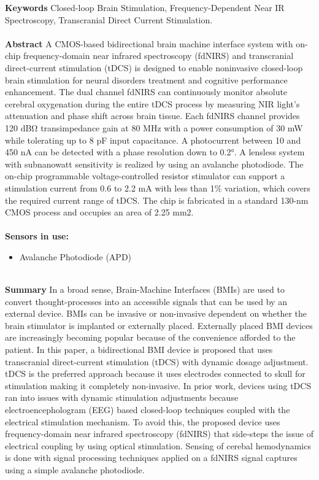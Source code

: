 \noindent
\textbf{Keywords} Closed-loop Brain Stimulation, Frequency-Dependent Near IR Spectroscopy, Transcranial Direct Current Stimulation. \\ \\

\noindent
\textbf{Abstract} A CMOS-based bidirectional brain machine interface system with on-chip frequency-domain near infrared spectroscopy (fdNIRS) and transcranial direct-current stimulation (tDCS) is designed to enable noninvasive closed-loop brain stimulation for neural disorders treatment and cognitive performance enhancement. The dual channel fdNIRS can continuously monitor absolute cerebral oxygenation during the entire tDCS process by measuring NIR light's attenuation and phase shift across brain tissue. Each fdNIRS channel provides 120 dBΩ transimpedance gain at 80 MHz with a power consumption of 30 mW while tolerating up to 8 pF input capacitance. A photocurrent between 10 and 450 nA can be detected with a phase resolution down to 0.2°. A lensless system with subnanowatt sensitivity is realized by using an avalanche photodiode. The on-chip programmable voltage-controlled resistor stimulator can support a stimulation current from 0.6 to 2.2 mA with less than 1\% variation, which covers the required current range of tDCS. The chip is fabricated in a standard 130-nm CMOS process and occupies an area of 2.25 mm2. \\ \\

\noindent
\textbf{Sensors in use:}
\begin{itemize}
    \item Avalanche Photodiode (APD) \\ \\
\end{itemize}

\noindent
\textbf{Summary} In a broad sense, Brain-Machine Interfaces (BMIs) are used to convert thought-processes into an accessible signals that can be used by an external device. BMIs can be invasive or non-invasive dependent on whether the brain stimulator is implanted or externally placed. Externally placed BMI devices are increasingly becoming popular because of the convenience afforded to the patient. In this paper, a bidirectional BMI device is proposed that uses transcranial direct-current stimulation (tDCS) with dynamic dosage adjustment. tDCS is the preferred approach because it uses electrodes connected to skull for stimulation making it completely non-invasive. In prior work, devices using tDCS ran into issues with dynamic stimulation adjustments because electroencephologram (EEG) based closed-loop techniques coupled with the electrical stimulation mechanism. To avoid this, the proposed device uses frequency-domain near infrared spectroscopy (fdNIRS) that side-steps the issue of electrical coupling by using optical stimulation. Sensing of cerebal hemodynamics is done with signal processing techniques applied on a fdNIRS signal captures using a simple avalanche photodiode. \\ \\

